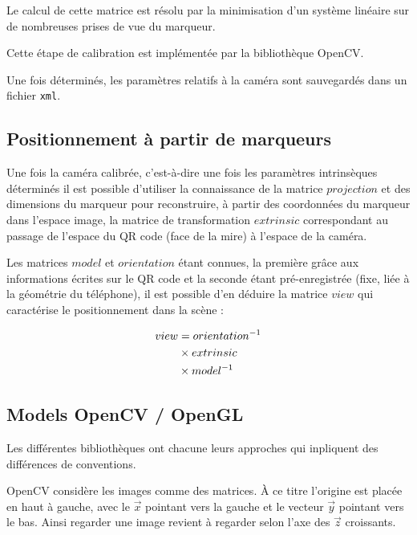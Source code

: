 \documentclass[10pt,a4paper,twoside, twocolumn]{report}
\begin{document}
Le calcul de cette matrice est résolu par la minimisation d'un système linéaire sur de nombreuses prises de vue du marqueur. 

Cette étape de calibration est implémentée par la bibliothèque OpenCV.

Une fois déterminés, les paramètres relatifs à la caméra sont sauvegardés dans un fichier \texttt{xml}.

\subsection{Positionnement à partir de marqueurs}\label{section:positionnement}

Une fois la caméra calibrée, c'est-à-dire une fois les paramètres intrinsèques déterminés il est possible d'utiliser la connaissance de la matrice $projection$ et des dimensions du marqueur pour reconstruire, à partir des coordonnées du marqueur dans l'espace image, la matrice de transformation $extrinsic$ correspondant au passage de l'espace du QR code (face de la mire) à l'espace de la caméra.

Les matrices $model$ et $orientation$ étant connues, la première grâce aux informations écrites sur le QR code et la seconde étant pré-enregistrée (fixe, liée à la géométrie du téléphone), il est possible d'en déduire la matrice $view$ qui caractérise le positionnement dans la scène :

\begin{align}
	view	&=			orientation^{-1}	\notag \\
				&\times extrinsic					\notag \\
				&\times model^{-1}
\end{align}

\subsection{Models OpenCV / OpenGL}

Les différentes bibliothèques ont chacune leurs approches qui inpliquent des différences de conventions.

OpenCV considère les images comme des matrices. À ce titre l'origine est placée en haut à gauche, avec le $\vec x$ pointant vers la gauche et le vecteur $\vec y$ pointant vers le bas. Ainsi regarder une image revient à regarder selon l'axe des $\vec z$ croissants.
\end{document}
